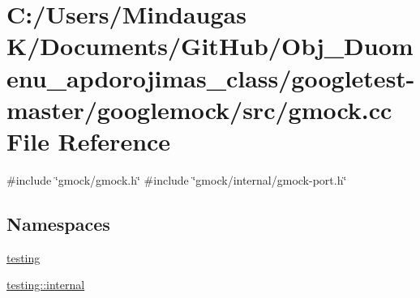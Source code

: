 \hypertarget{googletest-master_2googlemock_2src_2gmock_8cc}{}\section{C\+:/\+Users/\+Mindaugas K/\+Documents/\+Git\+Hub/\+Obj\+\_\+\+Duomenu\+\_\+apdorojimas\+\_\+class/googletest-\/master/googlemock/src/gmock.cc File Reference}
\label{googletest-master_2googlemock_2src_2gmock_8cc}
{\ttfamily \#include \char`\"{}gmock/gmock.\+h\char`\"{}}\newline
{\ttfamily \#include \char`\"{}gmock/internal/gmock-\/port.\+h\char`\"{}}\newline
\subsection*{Namespaces}
\begin{DoxyCompactItemize}
\item 
 \mbox{\hyperlink{namespacetesting}{testing}}
\item 
 \mbox{\hyperlink{namespacetesting_1_1internal}{testing\+::internal}}
\end{DoxyCompactItemize}
